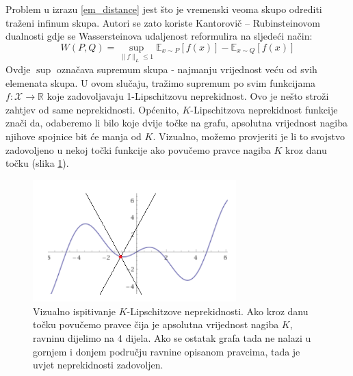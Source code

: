 Problem u izrazu \ref{em_distance} jest što je vremenski veoma skupo odrediti traženi infinum skupa. Autori se zato koriste Kantorovič -- Rubinsteinovom dualnosti gdje se Wassersteinova udaljenost reformulira na sljedeći način:
\begin{equation}
\label{kr_dual}
W(P, Q) = \sup_{\|f\|_L \leq 1} \mathbb{E}_{x \sim P} \left[f(x)\right] - \mathbb{E}_{x \sim Q}\left[f(x)\right]
\end{equation}
Ovdje $\sup$ označava supremum skupa - najmanju vrijednost veću od svih elemenata skupa. U ovom slučaju, tražimo supremum po svim funkcijama $f : \mathcal{X} \rightarrow \mathbb{R}$ koje zadovoljavaju 1-Lipschitzovu neprekidnost. Ovo je nešto stroži zahtjev od same neprekidnosti. Općenito, $K$-Lipschitzova neprekidnost \citep{lip_cont} funkcije znači da, odaberemo li bilo koje dvije točke na grafu, apsolutna vrijednost nagiba njihove spojnice bit će manja od $K$. Vizualno, možemo provjeriti je li to svojstvo zadovoljeno u nekoj točki funkcije ako povučemo pravce nagiba $K$ kroz danu točku (slika \ref{lip_cont}).
 
\begin{figure}[h]
\centering
		\includegraphics[width=0.7\textwidth]{images/lip_cont.png}
\caption{Vizualno ispitivanje $K$-Lipschitzove neprekidnosti. Ako kroz danu točku povučemo pravce čija je apsolutna vrijednost nagiba $K$, ravninu dijelimo na 4 dijela. Ako se ostatak grafa tada ne nalazi u gornjem i donjem području ravnine opisanom pravcima, tada je uvjet neprekidnosti zadovoljen.}
\label{lip_cont}
\end{figure}

